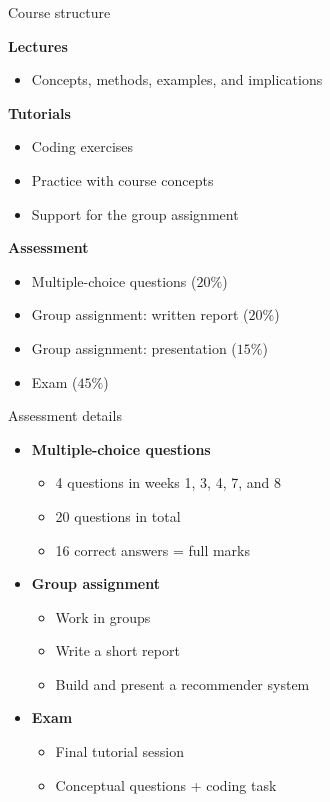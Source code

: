 \documentclass[handout]{beamer}
\begin{document}
\begin{frame}{Course structure}
\small

\textbf{Lectures}
\begin{itemize}
	\item Concepts, methods, examples, and implications
\end{itemize}

\vspace{-0.15cm}
\textbf{Tutorials}
\begin{itemize}
	\item Coding exercises
	\item Practice with course concepts
	\item Support for the group assignment
\end{itemize}

\vspace{-0.15cm}
\textbf{Assessment}
\begin{itemize}
	\item Multiple-choice questions (\(20\%\))
	\item Group assignment: written report (\(20\%\))
	\item Group assignment: presentation (\(15\%\))
	\item Exam (\(45\%\))
\end{itemize}
\end{frame}

\begin{frame}{Assessment details}
\begin{itemize}
	\item \textbf{Multiple-choice questions}
	\begin{itemize}
		\item 4 questions in weeks 1, 3, 4, 7, and 8
		\item 20 questions in total
		\item 16 correct answers = full marks
	\end{itemize}
	\item \textbf{Group assignment}
	\begin{itemize}
		\item Work in groups  
		\item Write a short report
		\item Build and present a recommender system
	\end{itemize}
	\item \textbf{Exam}
	\begin{itemize}
		\item Final tutorial session
		\item Conceptual questions + coding task
	\end{itemize}
\end{itemize}
\end{frame}
\end{document}
